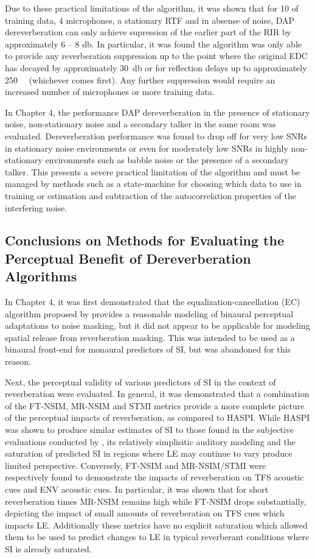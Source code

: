 Due to these practical limitations of the algorithm, it was shown that for \qty{10}{\sec} of training data, 4 microphones, a stationary RTF and in absense of noise, DAP dereverberation can only achieve supression of the earlier part of the RIR by approximately 6 -- 8 \unit{\decibel}. In particular, it was found the algorithm was only able to provide any reverberation suppression up to the point where the original EDC has decayed by approximately \qty{30}{\decibel} or for reflection delays up to approximately \qty{250}{\milli\sec} (whichever comes first). Any further suppression would require an increased number of microphones or more training data.

In Chapter 4, the performance DAP dereverberation in the presence of stationary noise, non-stationary noise and a secondary talker in the same room was evaluated. Dereverberation performance was found to drop off for very low SNRs in stationary noise environments or even for moderately low SNRs in highly non-stationary environments such as babble noise or the presence of a secondary talker. This presents a severe practical limitation of the algorithm and must be managed by methods such as a state-machine for choosing which data to use in training or estimation and subtraction of the autocorrelation properties of the interfering noise.

\subsection{Conclusions on Methods for Evaluating the Perceptual Benefit of Dereverberation Algorithms}

In Chapter 4, it was first demonstrated that the equalization-cancellation (EC) algorithm proposed by \cite{durlach1960note} provides a reasonable modeling of binaural perceptual adaptations to noise masking, but it did not appear to be applicable for modeling spatial release from reverberation masking. This was intended to be used as a binaural front-end for monaural predictors of SI, but was abandoned for this reason. 

Next, the perceptual validity of various predictors of SI in the context of reverberation were evaluated. In general, it was demonstrated that a combination of the FT-NSIM, MR-NSIM and STMI metrics provide a more complete picture of the perceptual impacts of reverberation, as compared to HASPI. While HASPI was shown to produce similar estimates of SI to those found in the subjective evaluations conducted by \cite{george2010measuring}, its relatively simplisitic auditory modeling and the saturation of predicted SI in regions where LE may continue to vary produce limited perspective. Conversely, FT-NSIM and MR-NSIM/STMI were respectively found to demonstrate the impacts of reverberation on TFS acoustic cues and ENV acoustic cues. In particular, it was shown that for short reverberation times MR-NSIM remains high while FT-NSIM drops substantially, depicting the impact of small amounts of reverberation on TFS cues which impacts LE. Additionally these metrics have no explicit saturation which allowed them to be used to predict changes to LE in typical reverberant conditions where SI is already saturated.

